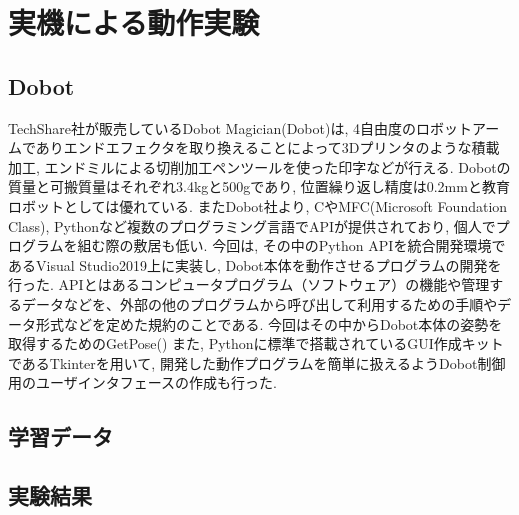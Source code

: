 \documentclass{suribt}
\begin{document}
\chapter{実機による動作実験}

\section{Dobot}
TechShare社が販売しているDobot Magician(Dobot)は, 4自由度のロボットアームでありエンドエフェクタを取り換えることによって3Dプリンタのような積載加工, エンドミルによる切削加工ペンツールを使った印字などが行える. 
Dobotの質量と可搬質量はそれぞれ3.4kgと500gであり, 位置繰り返し精度は0.2mmと教育ロボットとしては優れている. 
またDobot社より, CやMFC(Microsoft Foundation Class), Pythonなど複数のプログラミング言語でAPIが提供されており, 個人でプログラムを組む際の敷居も低い. 
今回は, その中のPython APIを統合開発環境であるVisual Studio2019上に実装し, Dobot本体を動作させるプログラムの開発を行った. APIとはあるコンピュータプログラム（ソフトウェア）の機能や管理するデータなどを、外部の他のプログラムから呼び出して利用するための手順やデータ形式などを定めた規約のことである. 
今回はその中からDobot本体の姿勢を取得するためのGetPose()
また, Pythonに標準で搭載されているGUI作成キットであるTkinterを用いて, 開発した動作プログラムを簡単に扱えるようDobot制御用のユーザインタフェースの作成も行った. 

\section{学習データ}

\section{実験結果}


\end{document}
